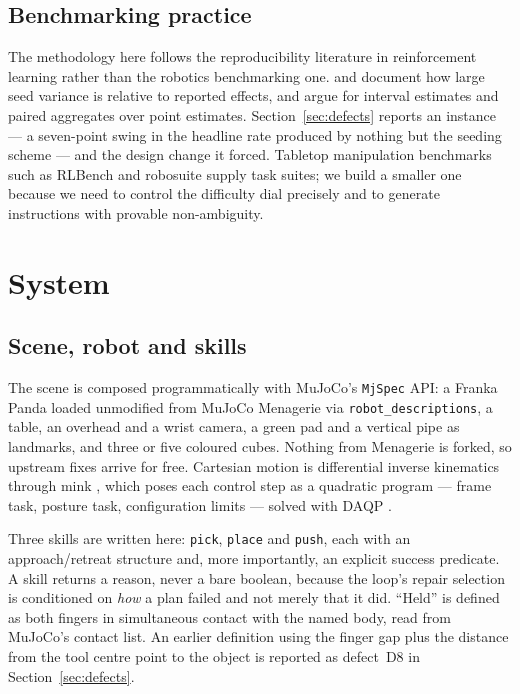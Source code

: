 \documentclass[11pt,a4paper]{article}
\newcommand{\defect}[1]{\textsc{#1}}
\begin{document}
\subsection{Benchmarking practice}
The methodology here follows the reproducibility literature in reinforcement
learning rather than the robotics benchmarking one. \citet{henderson2018deep} and
\citet{colas2018how} document how large seed variance is relative to reported
effects, and \citet{agarwal2021deep} argue for interval estimates and paired
aggregates over point estimates. Section~\ref{sec:defects} reports an instance
--- a seven-point swing in the headline rate produced by nothing but the seeding
scheme --- and the design change it forced. Tabletop manipulation benchmarks such
as RLBench \citep{james2020rlbench} and robosuite \citep{zhu2020robosuite} supply
task suites; we build a smaller one because we need to control the difficulty
dial precisely and to generate instructions with provable non-ambiguity.

\section{System}
\label{sec:system}

\subsection{Scene, robot and skills}
The scene is composed programmatically with MuJoCo's \texttt{MjSpec} API: a
Franka Panda loaded unmodified from MuJoCo Menagerie \citep{zakka2022menagerie}
via \texttt{robot\_descriptions}, a table, an overhead and a wrist camera, a
green pad and a vertical pipe as landmarks, and three or five coloured cubes.
Nothing from Menagerie is forked, so upstream fixes arrive for free. Cartesian
motion is differential inverse kinematics through mink \citep{zakka2024mink},
which poses each control step as a quadratic program --- frame task, posture
task, configuration limits --- solved with DAQP \citep{arnstrom2022daqp}.

Three skills are written here: \texttt{pick}, \texttt{place} and \texttt{push},
each with an approach/retreat structure and, more importantly, an explicit
success predicate. A skill returns a reason, never a bare boolean, because the
loop's repair selection is conditioned on \emph{how} a plan failed and not merely
that it did. ``Held'' is defined as both fingers in simultaneous contact with
the named body, read from MuJoCo's contact list. An earlier definition using the
finger gap plus the distance from the tool centre point to the object is
reported as defect~\defect{D8} in Section~\ref{sec:defects}.
\end{document}
